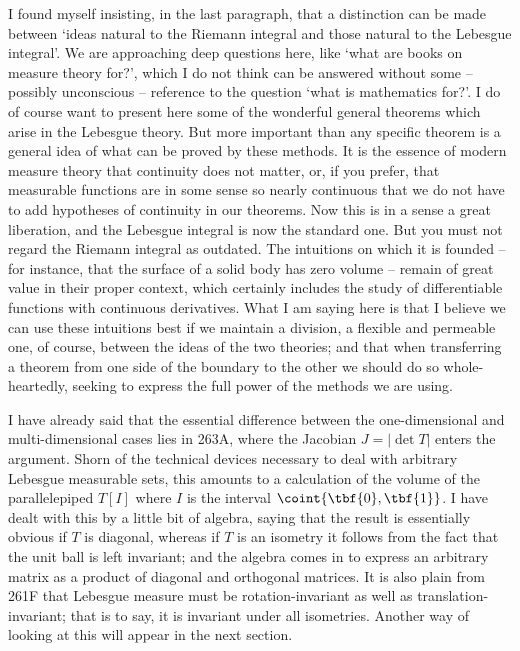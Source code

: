 {I found myself insisting, in the last paragraph, that a distinction can
be made between `ideas natural to the Riemann integral and those
natural to the Lebesgue integral'.   We are approaching deep questions
here, like `what are books on measure theory for?', which I do not
think can be answered without some -- possibly unconscious --
reference to the question `what is mathematics for?'.   I do of
course want to present here some of the wonderful general theorems which
arise in the Lebesgue theory.   But more important than any specific
theorem is a general idea of what can be proved by these methods.
It is the essence of modern measure theory that continuity does not
matter, or, if you prefer, that measurable functions are in some sense
so nearly continuous that we do not have to add hypotheses of continuity
in our theorems.   Now this is in a sense a great liberation, and the
Lebesgue integral is now the standard one.   But you must not regard the
Riemann integral as outdated.   The intuitions on which it is founded --
for instance, that the surface of a solid body has zero volume -- remain
of great value in their proper context, which certainly includes the
study of differentiable functions with continuous derivatives.   What I
am saying here is that I believe we can use these intuitions best if we
maintain a division, a flexible and permeable one, of course, between
the ideas of the two theories;  and that when transferring a theorem
from one side of the boundary to the other we should do so
whole-heartedly, seeking to express the full power of the methods we are
using.

I have already said that the essential difference between the
one-dimensional and multi-dimensional cases lies in 263A, where the
Jacobian $J=|\det T|$ enters the argument.   Shorn of the technical
devices necessary to deal with arbitrary Lebesgue measurable sets, this
amounts to a calculation of the volume of the parallelepiped $T[I]$
where $I$ is the interval $\coint{\tbf{0},\tbf{1}}$.   I have dealt with
this by a little bit of algebra, saying that the result is essentially
obvious if $T$ is diagonal, whereas if $T$ is an isometry it follows
from the fact that the unit ball is left invariant;  and the algebra
comes in to express an arbitrary matrix as a product of diagonal and
orthogonal matrices.    It is also plain from 261F that Lebesgue
measure must be rotation-invariant as well as translation-invariant;
that is to
say, it is invariant under all isometries.   Another way of looking at
this will appear in the next section.

}
